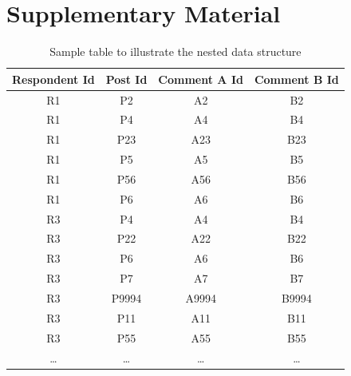 \documentclass{article}
\begin{document}
\newpage



\clearpage
\section{Supplementary Material}

\begin{table}[htbp]
    \centering
    \begin{tabular}{|c|c|c|c|}
    \hline
    \textbf{Respondent Id} & \textbf{Post Id} & \textbf{Comment A Id} & \textbf{Comment B Id} \\
    \hline
    R1 & P2 & A2 & B2 \\
    R1 & P4 & A4 & B4 \\
    R1 & P23 & A23 & B23 \\
    R1 & P5 & A5 & B5 \\
    R1 & P56 & A56 & B56 \\
    R1 & P6 & A6 & B6 \\
    \midrule
    R3 & P4 & A4 & B4 \\
    R3 & P22 & A22 & B22 \\
    R3 & P6 & A6 & B6 \\
    R3 & P7 & A7 & B7 \\
    R3 & P9994 & A9994 & B9994 \\
    R3 & P11 & A11 & B11 \\
    R3 & P55 & A55 & B55 \\
    \midrule
    \dots & \dots & \dots & \dots \\
    \hline
    \end{tabular}
    \caption{Sample table to illustrate the nested data structure}
    \label{sample-table}
\end{table}

\clearpage

\end{document}
